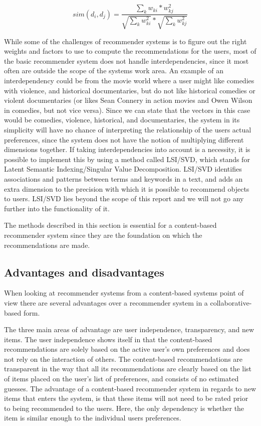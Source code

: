 \[
	sim({d_{i},d_{j}}) = \frac{\sum_{k}w_{ki}*w_{kj}^2}{\sqrt{\sum_{k}w_{ki}^2}*\sqrt{\sum_{k}w_{kj}^2}}
\]


While some of the challenges of recommender systems is to figure out the right weights and factors to use to compute the recommendations for the users, most of the basic recommender system does not handle interdependencies, since it most often are outside the scope of the systems work area.\newline
An example of an interdependency could be from the movie world where a user might like comedies with violence, and historical documentaries, but do not like historical comedies or violent documentaries (or likes Sean Connery in action movies and Owen Wilson in comedies, but not vice versa). \newline
Since we can state that the vectors in this case would be comedies, violence, historical, and documentaries, the system in its simplicity will have no chance of interpreting the relationship of the users actual preferences, since the system does not have the notion of multiplying different dimensions together. If taking interdependencies into account is a necessity, it is possible to implement this by using a method called LSI/SVD, which stands for Latent Semantic Indexing/Singular Value Decomposition. LSI/SVD identifies associations and patterns between terms and keywords in a text, and adds an extra dimension to the precision with which it is possible to recommend objects to users. LSI/SVD lies beyond the scope of this report and we will not go any further into the functionality of it.\newline

The methods described in this section is essential for a content-based recommender system since they are the foundation on which the recommendations are made.

\subsection{Advantages and disadvantages}
When looking at recommender systems from a content-based systems point of view there are several advantages over a recommender system in a collaborative-based form.\newline

The three main areas of advantage are user independence, transparency, and new items.\newline
The user independence shows itself in that the content-based recommendations are solely based on the active user's own preferences and does not rely on the interaction of others.\newline
The content-based recommendations are transparent in the way that all its recommendations are clearly based on the list of items placed on the user's list of preferences, and consists of no estimated guesses.\newline
The advantage of a content-based recommender system in regards to new items that enters the system, is that these items will not need to be rated prior to being recommended to the users. Here, the only dependency is whether the item is similar enough to the individual users preferences.\newline

